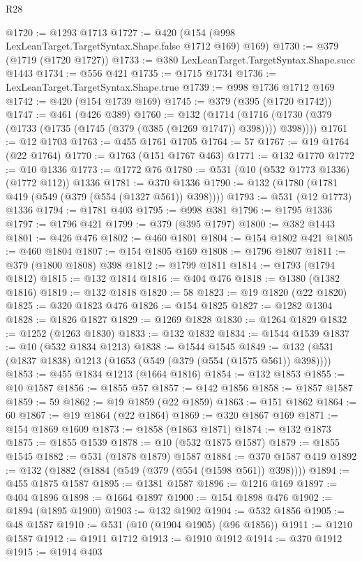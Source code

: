 \begin{lexlean}{R28}
\begin{coremodule}
@1720 := @1293 @1713
@1727 := @420 (@154 (@998 LexLeanTarget.TargetSyntax.Shape.false @1712 @169) @169)
@1730 := @379 (@1719 (@1720 @1727))
@1733 := @380 LexLeanTarget.TargetSyntax.Shape.succ @1443
@1734 := @556 @421
@1735 := @1715 @1734
@1736 := LexLeanTarget.TargetSyntax.Shape.true
@1739 := @998 @1736 @1712 @169
@1742 := @420 (@154 @1739 @169)
@1745 := @379 (@395 (@1720 @1742))
@1747 := @461 (@426 @389)
@1760 := @132
    (@1714 (@1716 (@1730 (@379 (@1733 (@1735 (@1745 (@379 (@385 (@1269 @1747)) @398)))) @398))))
@1761 := @12 @1703
@1763 := @455 @1761 @1705
@1764 := 57
@1767 := @19 @1764 (@22 @1764)
@1770 := @1763 (@151 @1767 @463)
@1771 := @132 @1770
@1772 := @10 @1336
@1773 := @1772 @76
@1780 := @531 (@10 (@532 @1773 @1336) (@1772 @112)) @1336
@1781 := @370 @1336
@1790 := @132 (@1780 (@1781 @419 (@549 (@379 (@554 (@1327 @561)) @398))))
@1793 := @531 (@12 @1773) @1336
@1794 := @1781 @403
@1795 := @998 @381
@1796 := @1795 @1336
@1797 := @1796 @421
@1799 := @379 (@395 @1797)
@1800 := @382 @1443
@1801 := @426 @476
@1802 := @460 @1801
@1804 := @154 @1802 @421
@1805 := @460 @1804
@1807 := @154 @1805 @169
@1808 := @1796 @1807
@1811 := @379 (@1800 @1808) @398
@1812 := @1799 @1811
@1814 := @1793 (@1794 @1812)
@1815 := @132 @1814
@1816 := @404 @476
@1818 := @1380 (@1382 @1816)
@1819 := @132 @1818
@1820 := 58
@1823 := @19 @1820 (@22 @1820)
@1825 := @320 @1823 @476
@1826 := @154 @1825
@1827 := @1282 @1304
@1828 := @1826 @1827
@1829 := @1269 @1828
@1830 := @1264 @1829
@1832 := @1252 (@1263 @1830)
@1833 := @132 @1832
@1834 := @1544 @1539
@1837 := @10 (@532 @1834 @1213)
@1838 := @1544 @1545
@1849 := @132 (@531 (@1837 @1838) @1213 (@1653 (@549 (@379 (@554 (@1575 @561)) @398))))
@1853 := @455 @1834 @1213 (@1664 @1816)
@1854 := @132 @1853
@1855 := @10 @1587
@1856 := @1855 @57
@1857 := @142 @1856
@1858 := @1857 @1587
@1859 := 59
@1862 := @19 @1859 (@22 @1859)
@1863 := @151 @1862
@1864 := 60
@1867 := @19 @1864 (@22 @1864)
@1869 := @320 @1867 @169
@1871 := @154 @1869 @1609
@1873 := @1858 (@1863 @1871)
@1874 := @132 @1873
@1875 := @1855 @1539
@1878 := @10 (@532 @1875 @1587)
@1879 := @1855 @1545
@1882 := @531 (@1878 @1879) @1587
@1884 := @370 @1587 @419
@1892 := @132 (@1882 (@1884 (@549 (@379 (@554 (@1598 @561)) @398))))
@1894 := @455 @1875 @1587
@1895 := @1381 @1587
@1896 := @1216 @169
@1897 := @404 @1896
@1898 := @1664 @1897
@1900 := @154 @1898 @476
@1902 := @1894 (@1895 @1900)
@1903 := @132 @1902
@1904 := @532 @1856
@1905 := @48 @1587
@1910 := @531 (@10 (@1904 @1905) (@96 @1856))
@1911 := @1210 @1587
@1912 := @1911 @1712
@1913 := @1910 @1912
@1914 := @370 @1912
@1915 := @1914 @403

\end{coremodule}
\end{lexlean}
